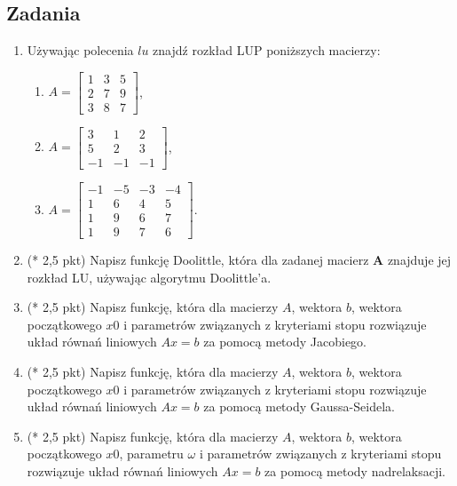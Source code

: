 \documentclass[12pt,a4paper]{article}
\theoremstyle{definition}
\begin{document}
\subsection*{Zadania}
\begin{enumerate}
	
	\item Używając polecenia $lu$ znajdź rozkład LUP poniższych macierzy:
	\begin{enumerate}
		\item $A=\left[\begin{array}{ccc}1&3&5\\2&7&9\\3&8&7\end{array}\right]$,
		\item $A=\left[\begin{array}{ccc}3&1&2\\5&2&3\\-1&-1&-1\end{array}\right]$,
		\item $A=\left[\begin{array}{cccc}-1&-5&-3&-4\\1&6&4&5\\1&9&6&7\\1&9&7&6\end{array}\right]$.
	\end{enumerate}
	
	
	\item (* 2,5 pkt) Napisz funkcję Doolittle, która dla zadanej macierz $\pmb{A}$ znajduje jej rozkład LU, używając algorytmu Doolittle'a.
	
	
	
		\item (* 2,5 pkt) Napisz funkcję, która dla macierzy $A$, wektora $b$, wektora początkowego $x0$ i parametrów związanych z kryteriami stopu rozwiązuje układ równań liniowych $Ax=b$ za pomocą metody Jacobiego.
		
		\item (* 2,5 pkt) Napisz funkcję, która dla macierzy $A$, wektora $b$, wektora początkowego $x0$ i parametrów związanych z kryteriami stopu rozwiązuje układ równań liniowych $Ax=b$ za pomocą metody Gaussa-Seidela.
		
		\item (* 2,5 pkt) Napisz funkcję, która dla macierzy $A$, wektora $b$, wektora początkowego $x0$, parametru $\omega$ i parametrów związanych z kryteriami stopu rozwiązuje układ równań liniowych $Ax=b$ za pomocą metody nadrelaksacji.
		
		\end{enumerate}
\end{document}
